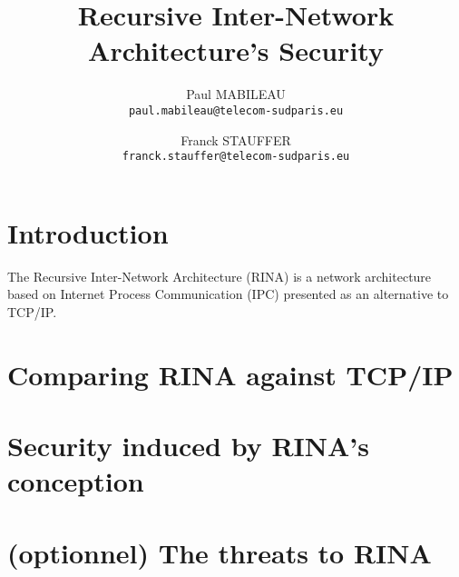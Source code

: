 \documentclass[a4paper]{proc}
\author{Paul MABILEAU\\\texttt{paul.mabileau@telecom-sudparis.eu} \and Franck STAUFFER\\\texttt{franck.stauffer@telecom-sudparis.eu}}
\title{\textbf{Recursive Inter-Network Architecture's Security}}
\begin{document}
\maketitle
\tableofcontents
\newpage
\part*{Introduction}
The Recursive Inter-Network Architecture (RINA) is a network architecture based on Internet Process Communication
(IPC) presented as an alternative to TCP/IP.

\part{Comparing RINA against TCP/IP}

\part{Security induced by RINA's conception}

\part{(optionnel) The threats to RINA}

\nocite{*}
\newpage


\end{document}
